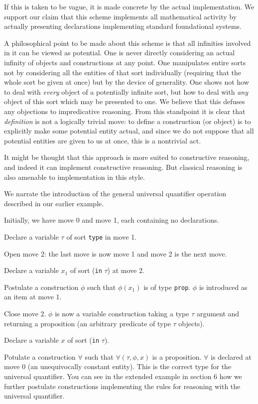 \documentclass[12pt]{article}
\begin{document}
If this is taken to be vague, it is made concrete by the actual implementation.  We support our claim that this scheme implements all mathematical activity by actually presenting declarations implementing standard foundational systems.

A philosophical point to be made about this scheme is that all infinities involved in it can be viewed as potential.   One is never directly considering an actual infinity of objects and constructions at any point.   One manipulates entire sorts not by considering all the entities of that sort individually (requiring that the whole sort be given at once) but by the device of generality.  One shows not how to deal with {\em every \/} object of a potentially infinite sort, but how to deal with {\em any\/} object of this sort which may be  presented to one.  We believe that this defuses any objections to impredicative reasoning.  From this standpoint it is clear that {\em definition} is not a logically trivial move:  to define a construction (or object) is to explicitly  make some potential entity actual, and since we do not suppose that all potential entities are given to us at once, this is a nontrivial act.

It might be thought that this approach is more suited to constructive reasoning, and indeed it can implement constructive reasoning.  But classical reasoning is also amenable to implementation in this style.

We narrate the introduction of the general universal quantifier operation described in our earlier example.

Initially, we have move 0 and move 1, each containing no declarations.

Declare a variable $\tau$ of sort {\tt type}  in move 1.

Open move 2:  the last move is now move 1 and move 2 is the next move.

Declare a variable $x_1$ of sort ({\tt in} $\tau$) at move 2.

Postulate a construction $\phi$ such that $\phi(x_1)$ is of type {\tt prop}.  $\phi$ is introduced as an item
at move 1.

Close move 2.  $\phi$ is now a variable construction taking a type $\tau$ argument and returning a proposition (an arbitrary predicate of
type $\tau$ objects).

Declare a variable $x$ of sort ({\tt in} $\tau$).

Potulate a construction $\forall$ such that $\forall(\tau,\phi,x)$ is a proposition.  $\forall$ is declared at move 0 (an unequivocally constant entity).  This is the correct type for
the universal quantifier.  You can see in the extended example in section 6 how we further postulate constructions implementing
the rules for reasoning with the universal quantifier.
\end{document}
